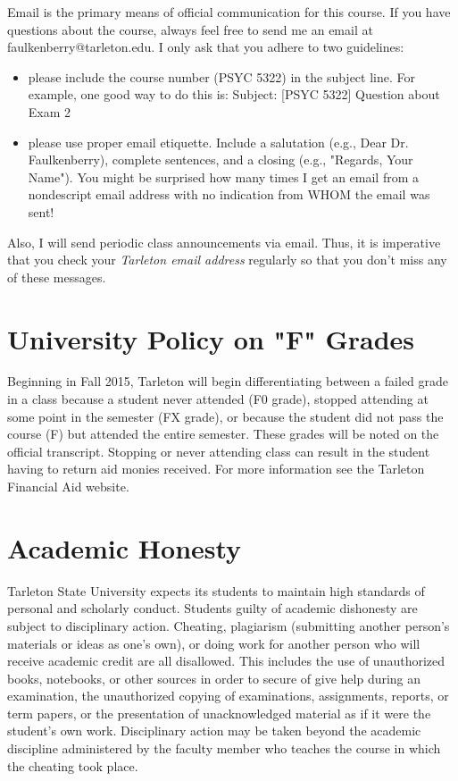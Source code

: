 \documentclass[10pt]{article}
\begin{document}
Email is the primary means of official communication for this course.  If you have questions about the course, always feel free to send me an email at faulkenberry@tarleton.edu.  I only ask that you adhere to two guidelines:
\begin{itemize}
\item please include the course number (PSYC 5322) in the subject line.  For example, one good way to do this is:  Subject: [PSYC 5322] Question about Exam 2
\item please use proper email etiquette.  Include a salutation (e.g., Dear Dr. Faulkenberry), complete sentences, and a closing (e.g., "Regards, Your Name").  You might be surprised how many times I get an email from a nondescript email address with no indication from WHOM the email was sent!
\end{itemize}

Also, I will send periodic class announcements via email.  Thus, it is imperative that you check your \emph{Tarleton email address} regularly so that you don't miss any of these messages.

\section*{University Policy on "F" Grades}
\label{sec:org0e3d6ee}
Beginning in Fall 2015, Tarleton will begin differentiating between a failed grade in a class because a student never attended (F0 grade), stopped attending at some point in the semester (FX grade), or because the student did not pass the course (F) but attended the entire semester. These grades will be noted on the official transcript. Stopping or never attending class can result in the student having to return aid monies received.  For more information see the Tarleton Financial Aid website.

\section*{Academic Honesty}
\label{sec:org26f4f3c}

Tarleton State University expects its students to maintain high standards of personal and scholarly conduct. Students guilty of academic dishonesty are subject to disciplinary action. Cheating, plagiarism (submitting another person’s materials or ideas as one’s own), or doing work for another person who will receive academic credit are all disallowed. This includes the use of unauthorized books, notebooks, or other sources in order to secure of give help during an examination, the unauthorized copying of examinations, assignments, reports, or term papers, or the presentation of unacknowledged material as if it were the student’s own work. Disciplinary action may be taken beyond the academic discipline administered by the faculty member who teaches the course in which the cheating took place.
\end{document}
